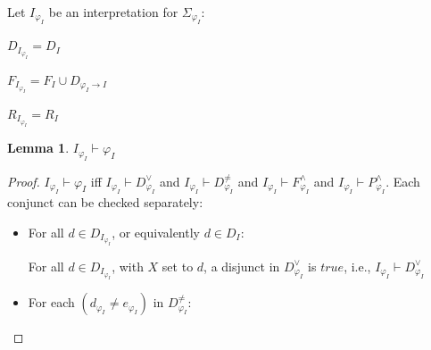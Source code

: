 \documentclass[letterpaper]{article}
\newenvironment{packed_itemize}{
\vspace*{-0.2em}
\begin{itemize}
\setlength{\partopsep}{0pt}
\setlength{\itemsep}{1pt}
\setlength{\parskip}{0pt}
\setlength{\parsep}{0pt}
}{\end{itemize}}
\newtheorem*{lemma}{Lemma}
\newcommand{\true}{{\mathit{true}}}
\begin{document}
\noindent
Let $I_{\varphi_I}$ be an interpretation for $\Sigma_{\varphi_I}$:
\begin{packed_itemize}
\item $D_{I_{\varphi_I}} = D_I$
\item $F_{I_{\varphi_I}} = F_I \cup D_{\varphi_I \rightarrow I}$
\item $R_{I_{\varphi_I}} = R_I$
\end{packed_itemize}

\begin{lemma} 
$I_{\varphi_I} \vdash \varphi_I$
\end{lemma}
\vspace*{-1em}
\begin{proof}
$I_{\varphi_I} \vdash \varphi_I$ iff 
$I_{\varphi_I} \vdash D^\vee_{\varphi_I}$ and
$I_{\varphi_I} \vdash D^{\neq}_{\varphi_I}$ and
$I_{\varphi_I} \vdash F^\wedge_{\varphi_I}$ and
$I_{\varphi_I} \vdash P^\wedge_{\varphi_I}$. Each conjunct can be checked separately:
\begin{itemize}
\item For all $d \in D_{I_{\varphi_I}}$, or equivalently $d \in D_I$:
      For all $d \in D_{I_{\varphi_I}}$, with $X$ set to $d$, a disjunct in $D^\vee_{\varphi_I}$ 
      is $\true$, i.e., $I_{\varphi_I} \vdash D^\vee_{\varphi_I}$
\item For each $(d_{\varphi_I} \neq e_{\varphi_I})$ in $D^{\neq}_{\varphi_I}$:
\end{itemize}
\end{proof}
\end{document}

